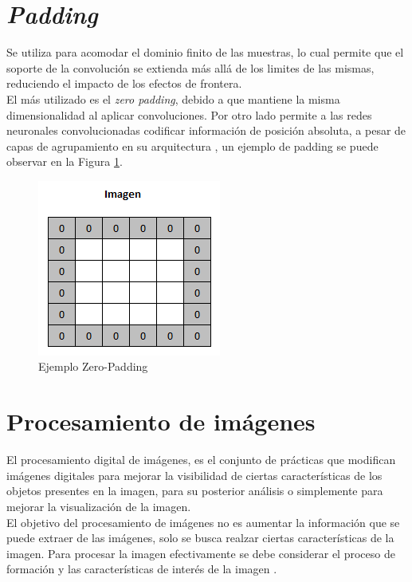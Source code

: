 \section{\textit{Padding}}

Se utiliza para acomodar el dominio finito de las muestras, lo cual permite que el soporte de la convolución se extienda más allá de los limites de las mismas, reduciendo el impacto de los efectos de frontera.\\

El más utilizado es el \textit{zero padding}, debido a que mantiene la misma dimensionalidad al aplicar convoluciones. Por otro lado permite a las redes neuronales convolucionadas codificar información de posición absoluta, a pesar de capas de agrupamiento en su arquitectura \cite{islam2021position}, un ejemplo de padding se puede observar en la Figura \ref{padding}.

\begin{figure}[ht]
	\centering
	\includegraphics[scale=0.65]{Figs/padding.png}
	\caption{Ejemplo Zero-Padding}
	\label{padding}
\end{figure}


\newpage
\section{Procesamiento de imágenes} El procesamiento digital de imágenes, es el conjunto de prácticas que modifican imágenes digitales para mejorar la visibilidad de ciertas características de los objetos presentes en la imagen, para su posterior análisis o simplemente para mejorar la visualización de la
imagen.\\

El objetivo del procesamiento de imágenes no es aumentar la información que se puede extraer de las imágenes, solo se busca realzar ciertas características de la imagen. Para procesar la imagen efectivamente se debe considerar el proceso de formación y las características de interés de la imagen \cite{ref_13}.


